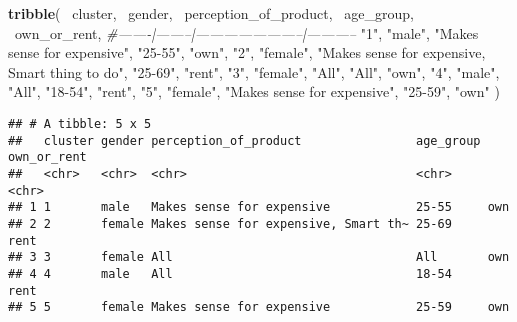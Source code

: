 \documentclass[]{article}
\newenvironment{Shaded}{\begin{snugshade}}{\end{snugshade}}
\newcommand{\KeywordTok}[1]{\textcolor[rgb]{0.13,0.29,0.53}{\textbf{{#1}}}}
\newcommand{\StringTok}[1]{\textcolor[rgb]{0.31,0.60,0.02}{{#1}}}
\newcommand{\CommentTok}[1]{\textcolor[rgb]{0.56,0.35,0.01}{\textit{{#1}}}}
\newcommand{\NormalTok}[1]{{#1}}
\begin{document}
\begin{Shaded}
\begin{Highlighting}[]
\KeywordTok{tribble}\NormalTok{(}
  \NormalTok{~cluster, ~gender, ~perception_of_product, ~age_group, ~own_or_rent,}
  \CommentTok{#-------|--------|-----------------------|-----------}
  \StringTok{"1"}\NormalTok{, }\StringTok{"male"}\NormalTok{, }\StringTok{"Makes sense for expensive"}\NormalTok{, }\StringTok{"25-55"}\NormalTok{, }\StringTok{"own"}\NormalTok{,}
  \StringTok{"2"}\NormalTok{, }\StringTok{"female"}\NormalTok{, }\StringTok{"Makes sense for expensive, Smart thing to do"}\NormalTok{, }\StringTok{"25-69"}\NormalTok{, }\StringTok{"rent"}\NormalTok{,}
  \StringTok{"3"}\NormalTok{, }\StringTok{"female"}\NormalTok{, }\StringTok{"All"}\NormalTok{, }\StringTok{"All"}\NormalTok{, }\StringTok{"own"}\NormalTok{,}
  \StringTok{"4"}\NormalTok{, }\StringTok{"male"}\NormalTok{, }\StringTok{"All"}\NormalTok{, }\StringTok{"18-54"}\NormalTok{, }\StringTok{"rent"}\NormalTok{,}
  \StringTok{"5"}\NormalTok{, }\StringTok{"female"}\NormalTok{, }\StringTok{"Makes sense for expensive"}\NormalTok{, }\StringTok{"25-59"}\NormalTok{, }\StringTok{"own"}
\NormalTok{)}
\end{Highlighting}
\end{Shaded}

\begin{verbatim}
## # A tibble: 5 x 5
##   cluster gender perception_of_product                age_group own_or_rent
##   <chr>   <chr>  <chr>                                <chr>     <chr>      
## 1 1       male   Makes sense for expensive            25-55     own        
## 2 2       female Makes sense for expensive, Smart th~ 25-69     rent       
## 3 3       female All                                  All       own        
## 4 4       male   All                                  18-54     rent       
## 5 5       female Makes sense for expensive            25-59     own
\end{verbatim}
\end{document}
